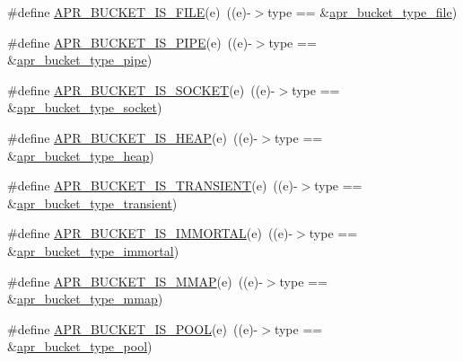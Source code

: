 \begin{DoxyCompactItemize}
\item 
\#define \hyperlink{group___a_p_r___util___bucket___brigades_ga1d54037bb6953c73d5c61f64c311d470}{A\-P\-R\-\_\-\-B\-U\-C\-K\-E\-T\-\_\-\-I\-S\-\_\-\-F\-I\-L\-E}(e)~((e)-\/$>$type == \&\hyperlink{group___a_p_r___util___bucket___brigades_ga5f17aa7e616179411a06475ec09626e9}{apr\-\_\-bucket\-\_\-type\-\_\-file})
\item 
\#define \hyperlink{group___a_p_r___util___bucket___brigades_ga03e62d86c994d1d1cc9be3eb8b8f6ac6}{A\-P\-R\-\_\-\-B\-U\-C\-K\-E\-T\-\_\-\-I\-S\-\_\-\-P\-I\-P\-E}(e)~((e)-\/$>$type == \&\hyperlink{group___a_p_r___util___bucket___brigades_ga334a875abb2908364a40abbfa80c401f}{apr\-\_\-bucket\-\_\-type\-\_\-pipe})
\item 
\#define \hyperlink{group___a_p_r___util___bucket___brigades_ga4b8315b498e4eb67efde1c83bdbe8b87}{A\-P\-R\-\_\-\-B\-U\-C\-K\-E\-T\-\_\-\-I\-S\-\_\-\-S\-O\-C\-K\-E\-T}(e)~((e)-\/$>$type == \&\hyperlink{group___a_p_r___util___bucket___brigades_gaa6d9978cc10895bdf0a4686728822a84}{apr\-\_\-bucket\-\_\-type\-\_\-socket})
\item 
\#define \hyperlink{group___a_p_r___util___bucket___brigades_ga3dee4fbd5b4e16e5188a6cfec40b6961}{A\-P\-R\-\_\-\-B\-U\-C\-K\-E\-T\-\_\-\-I\-S\-\_\-\-H\-E\-A\-P}(e)~((e)-\/$>$type == \&\hyperlink{group___a_p_r___util___bucket___brigades_ga2c5608267ed7b860657f5a1c89c2f40d}{apr\-\_\-bucket\-\_\-type\-\_\-heap})
\item 
\#define \hyperlink{group___a_p_r___util___bucket___brigades_ga1a7e7ac5fddbab4ce189e8d3007446ff}{A\-P\-R\-\_\-\-B\-U\-C\-K\-E\-T\-\_\-\-I\-S\-\_\-\-T\-R\-A\-N\-S\-I\-E\-N\-T}(e)~((e)-\/$>$type == \&\hyperlink{group___a_p_r___util___bucket___brigades_ga1692ced61c1966e67adc05ec2a69ce9b}{apr\-\_\-bucket\-\_\-type\-\_\-transient})
\item 
\#define \hyperlink{group___a_p_r___util___bucket___brigades_ga53f1188c168acf7dcfabfa1ac5a08655}{A\-P\-R\-\_\-\-B\-U\-C\-K\-E\-T\-\_\-\-I\-S\-\_\-\-I\-M\-M\-O\-R\-T\-A\-L}(e)~((e)-\/$>$type == \&\hyperlink{group___a_p_r___util___bucket___brigades_ga391ac24b2c85969e8efa504588b364bb}{apr\-\_\-bucket\-\_\-type\-\_\-immortal})
\item 
\#define \hyperlink{group___a_p_r___util___bucket___brigades_ga1693d49aeb0287e3b171c922c6b633d2}{A\-P\-R\-\_\-\-B\-U\-C\-K\-E\-T\-\_\-\-I\-S\-\_\-\-M\-M\-A\-P}(e)~((e)-\/$>$type == \&\hyperlink{group___a_p_r___util___bucket___brigades_ga63f9ce8e4d6e796921aad14a218a3b23}{apr\-\_\-bucket\-\_\-type\-\_\-mmap})
\item 
\#define \hyperlink{group___a_p_r___util___bucket___brigades_gadbe80a9016da6a06ab414ba61d6625d0}{A\-P\-R\-\_\-\-B\-U\-C\-K\-E\-T\-\_\-\-I\-S\-\_\-\-P\-O\-O\-L}(e)~((e)-\/$>$type == \&\hyperlink{group___a_p_r___util___bucket___brigades_ga87bace819fdbf07c12497a8289b3567b}{apr\-\_\-bucket\-\_\-type\-\_\-pool})

\end{DoxyCompactItemize}
